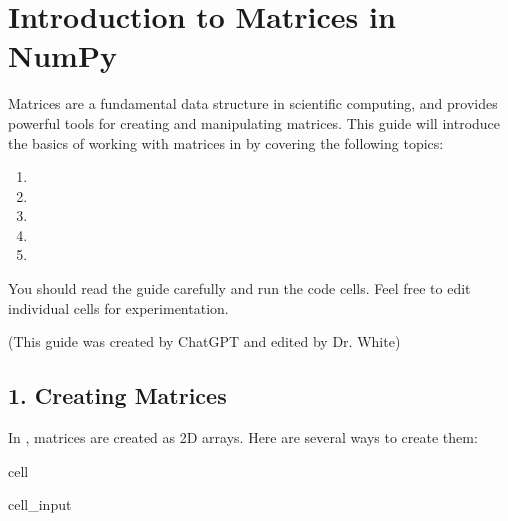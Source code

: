 \documentclass[letterpaper,10pt,english]{jupyterBook}
\begin{document}
\chapter{Introduction to Matrices in NumPy}
\label{\detokenize{lessons/Intro_to_Matrices_in_NumPy:introduction-to-matrices-in-numpy}}\label{\detokenize{lessons/Intro_to_Matrices_in_NumPy::doc}}
\sphinxAtStartPar
Matrices are a fundamental data structure in scientific computing, and  provides powerful tools for creating and manipulating matrices. This guide will introduce the basics of working with matrices in  by covering the following topics:
\begin{enumerate}
%
\item {} 
\sphinxAtStartPar
{}

\item {} 
\sphinxAtStartPar
{}

\item {} 
\sphinxAtStartPar
{}

\item {} 
\sphinxAtStartPar
{}

\item {} 
\sphinxAtStartPar
{}

\end{enumerate}

\sphinxAtStartPar
You should read the guide carefully and run the code cells. Feel free to edit individual cells for experimentation.

\sphinxAtStartPar
(This guide was created by ChatGPT and edited by Dr. White)


\section{1. Creating Matrices}
\label{\detokenize{lessons/Intro_to_Matrices_in_NumPy:creating-matrices}}
\sphinxAtStartPar
In , matrices are created as 2D arrays. Here are several ways to create them:

\begin{sphinxuseclass}{cell}\begin{sphinxVerbatimInput}

\begin{sphinxuseclass}{cell_input}
\begin{sphinxVerbatim}[commandchars=\\\{\}]
   
\end{sphinxVerbatim}

\end{sphinxuseclass}\end{sphinxVerbatimInput}

\end{sphinxuseclass}
\end{document}
